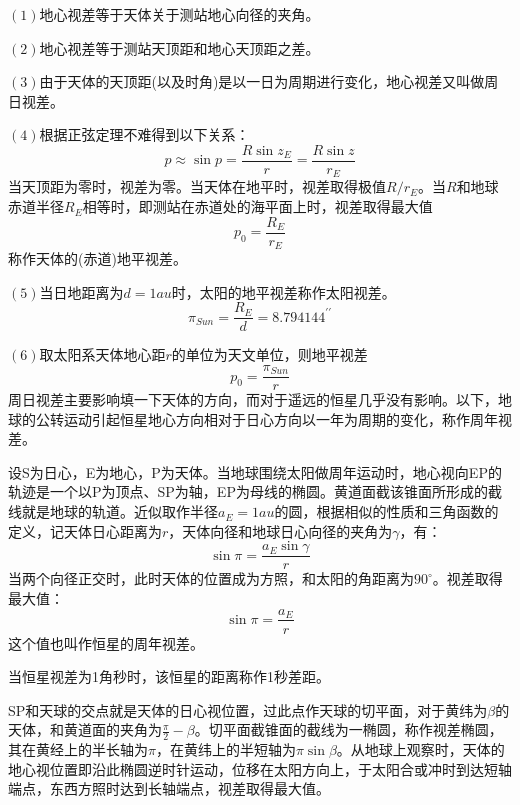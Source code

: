 \noindent $\left(1\right)$地心视差等于天体关于测站地心向径的夹角。

\noindent $\left(2\right)$地心视差等于测站天顶距和地心天顶距之差。

\noindent $\left(3\right)$由于天体的天顶距(以及时角)是以一日为周期进行变化，地心视差又叫做周日视差。

\noindent $\left(4\right)$根据正弦定理不难得到以下关系：
\begin{equation}
	p\approx \sin p=\frac{R\sin z_{E}}{r}=\frac{R\sin z}{r_{E}}
\end{equation}
当天顶距为零时，视差为零。当天体在地平时，视差取得极值$R/r_{E}$。当$R$和地球赤道半径$R_{E}$相等时，即测站在赤道处的海平面上时，视差取得最大值
\begin{equation}
	p_{0}=\frac{R_{E}}{r_{E}}
\end{equation}
称作天体的(赤道)地平视差。

\noindent $\left(5\right)$当日地距离为$d=1au$时，太阳的地平视差称作太阳视差。
\begin{equation}
	\pi_{Sun}=\frac{R_{E}}{d}=8.794144^{\prime\prime}
\end{equation}

\noindent $\left(6\right)$取太阳系天体地心距$r$的单位为天文单位，则地平视差
\begin{equation}
	p_{0}=\frac{\pi_{Sun}}{r}
\end{equation}
周日视差主要影响填一下天体的方向，而对于遥远的恒星几乎没有影响。以下，地球的公转运动引起恒星地心方向相对于日心方向以一年为周期的变化，称作周年视差。

设S为日心，E为地心，P为天体。当地球围绕太阳做周年运动时，地心视向EP的轨迹是一个以P为顶点、SP为轴，EP为母线的椭圆。黄道面截该锥面所形成的截线就是地球的轨道。近似取作半径$a_{E}=1au$的圆，根据相似的性质和三角函数的定义，记天体日心距离为$r$，天体向径和地球日心向径的夹角为$\gamma$，有：
\begin{equation}
	\sin\pi =\frac{a_{E}\sin \gamma}{r}
\end{equation}
当两个向径正交时，此时天体的位置成为方照，和太阳的角距离为$90^\circ$。视差取得最大值：
\begin{equation}
	\sin \pi =\frac{a_{E}}{r}
\end{equation}
这个值也叫作恒星的周年视差。

当恒星视差为1角秒时，该恒星的距离称作1秒差距。

SP和天球的交点就是天体的日心视位置，过此点作天球的切平面，对于黄纬为$\beta$的天体，和黄道面的夹角为$\frac{\pi}{2}-\beta$。切平面截锥面的截线为一椭圆，称作视差椭圆，其在黄经上的半长轴为$\pi$，在黄纬上的半短轴为$\pi\sin\beta$。从地球上观察时，天体的地心视位置即沿此椭圆逆时针运动，位移在太阳方向上，于太阳合或冲时到达短轴端点，东西方照时达到长轴端点，视差取得最大值。

